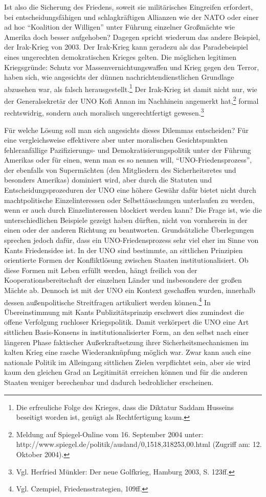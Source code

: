 \documentclass[12pt,a4paper,ngerman]{article}
\begin{document}
Ist also die Sicherung des Friedens, soweit sie militärisches
Eingreifen erfordert, bei entscheidungsfähigen und schlagkräftigen
Allianzen wie der NATO oder einer ad hoc "`Koalition der Willigen"'
unter Führung einzelner Großmächte wie Amerika doch besser aufgehoben?
Dagegen spricht wiederum das andere Beispiel, der Irak-Krieg von 2003.
Der Irak-Krieg kann geradezu als das Paradebeispiel eines ungerechten
demokratischen Krieges gelten. Die möglichen legitimen Kriegsgründe:
Schutz vor Massenvernichtungswaffen und Krieg gegen den Terror, haben
sich, wie angesichts der dünnen nachrichtendienstlichen Grundlage
abzusehen war, als falsch herausgestellt.\footnote{Die erfreuliche
  Folge des Krieges, dass die Diktatur Saddam Husseins beseitigt
  worden ist, genügt als Rechtfertigung kaum.} Der Irak-Krieg ist
damit nicht nur, wie der Generalsekretär der UNO Kofi Annan im
Nachhinein angemerkt hat,\footnote{Meldung auf Spiegel-Online vom 16.
  September 2004 unter:
  http://www.spiegel.de/politik/ausland/0,1518,318253,00.html (Zugriff
  am: 12. Oktober 2004).} formal rechtswidrig, sondern auch moralisch
ungerechtfertigt gewesen.\footnote{Vgl. Herfried Münkler: Der neue
  Golfkrieg, Hamburg 2003, S. 123ff.}

Für welche Lösung soll man sich angesichts dieses Dilemmas
entscheiden? Für eine vergleichsweise effektivere aber unter
moralischen Gesichtspunkten fehleranfällige Pazifizierungs- und
Demokratisierungspolitik unter der Führung Amerikas oder für einen,
wenn man es so nennen will, "`UNO-Friedensprozess"', der ebenfalls von
Supermächten (den Mitgliedern des Sicherheitsretes und besonders
Amerikas) dominiert wird, aber durch die Statuten und
Entscheidungsprozeduren der UNO eine höhere Gewähr dafür bietet nicht
durch machtpolitische Einzelinteressen oder Selbsttäuschungen
unterlaufen zu werden, wenn er auch durch Einzelinteressen blockiert
werden kann? Die Frage ist, wie die unterschiedlichen Beispiele
gezeigt haben dürften, nicht von vornherein in der einen oder der
anderen Richtung zu beantworten. Grundsätzliche Überlegungen sprechen
jedoch dafür, dass ein UNO-Friedensprozess sehr viel eher im Sinne von
Kants Friedensidee ist. In der UNO sind bestimmte, an sittlichen
Prinzipien orientierte Formen der Konfliktlösung zwischen Staaten
institutionalisiert. Ob diese Formen mit Leben erfüllt werden, hängt
freilich von der Kooperationsbereitschaft der einzelnen Länder und
insbesondere der großen Mächte ab. Dennoch ist mit der UNO ein Kontext
geschaffen wurden, innerhalb dessen außenpolitische Streitfragen
artikuliert werden können.\footnote{Vgl. Czempiel, Friedensstrategien,
  109ff.} In Übereinstimmung mit Kants Publizitätsprinzip erschwert
dies zumindest die offene Verfolgung ruchloser Kriegspolitik. Damit
verkörpert die UNO eine Art sittlichen Basis-Konsens in
institutionalisierter Form, an den selbst nach einer längeren Phase
faktischer Außerkraftsetzung ihrer Sicherheitsmechanismen im kalten
Krieg eine rasche Wiederanknüpfung möglich war. Zwar kann auch eine
nationale Politik im Alleingang sittlichen Zielen verpflichtet sein,
aber sie wird kaum den gleichen Grad an Legitimität erreichen können
und für die anderen Staaten weniger berechenbar und dadurch
bedrohlicher erscheinen.
\end{document}
